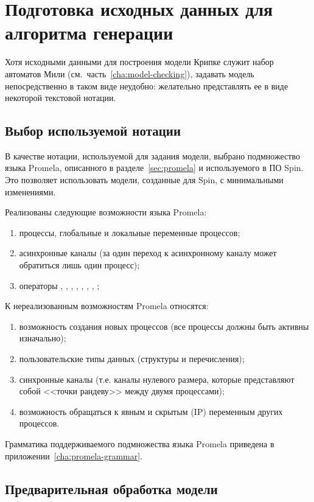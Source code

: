 \chapter{Подготовка исходных данных для алгоритма генерации}
\label{cha:code-gen}

Хотя исходными данными для построения модели Крипке служит набор автоматов Мили
(см.~часть~\ref{cha:model-checking}), задавать модель непосредственно в таком виде
неудобно: желательно представлять ее в виде некоторой текстовой нотации.

\section{Выбор используемой нотации}
\label{sec:notation-choice}

В качестве нотации, используемой для задания модели, выбрано подмножество языка Promela,
описанного в разделе~\ref{sec:promela} и используемого в ПО Spin. Это позволяет
использовать модели, созданные для Spin, с минимальными изменениями.

Реализованы следующие возможности языка Promela:
\begin{enumerate}
\item процессы, глобальные и локальные переменные процессов;
\item асинхронные каналы (за один переход к асинхронному каналу может обратиться лишь
  один процесс);
\item операторы , , , , ,
  , , ;
\end{enumerate}

К нереализованным возможностям Promela относятся:
\begin{enumerate}
\item возможность создания новых процессов (все процессы должны быть активны изначально);
\item пользовательские типы данных (структуры и перечисления);
\item синхронные каналы (т.е. каналы нулевого размера, которые представляют собой <<точки
  рандеву>> между двумя процессами);
\item возможность обращаться к явным и скрытым (IP) переменным других процессов.
\end{enumerate}

Грамматика поддерживаемого подмножества языка Promela приведена в
приложении~\ref{cha:promela-grammar}.

\section{Предварительная обработка модели}
\label{sec:idef0-codegen}

